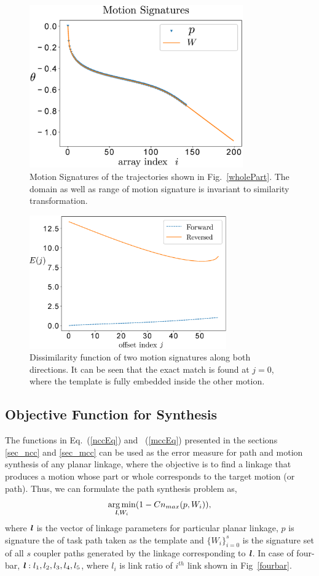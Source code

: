 \documentclass[twocolumn,10pt]{asme2ej}
\newcommand{\req}[1]{(\ref{#1})}
\DeclareMathOperator*{\argminA}{arg\,min}
\begin{document}
\begin{figure}
\centering
\includegraphics[width=260pt]{figure/fig_motion_signatures.eps}
  \caption{Motion Signatures of the trajectories shown in Fig.~\ref{wholePart}. The domain as well as range of motion signature is invariant to similarity transformation.}
\label{motionSignature}
\end{figure}

\begin{figure}
\centering
\includegraphics[width=240pt]{figure/fig_mcc.eps}
  \caption{Dissimilarity function of two motion signatures along both directions. It can be seen that the exact match is found at $j=0$, where the template is fully embedded inside the other motion.}
\label{mcc}
\end{figure}

\subsection{Objective Function for Synthesis}
The functions in Eq.~\req{nccEq} and ~\req{mccEq} presented in the sections \ref{sec_ncc} and \ref{sec_mcc} can be used as the error measure for path and motion synthesis of any planar linkage, where the objective is to find a linkage that produces a motion whose part or whole corresponds to the target motion (or path).
Thus, we can formulate the path synthesis problem as,
\begin{equation}\label{objectiveFunPath}
  \argminA_{\textbf{\emph{l}}, W_i} (1 - Cn_{max}(p, W_i)),
\end{equation}
where $\textbf{\emph{l}}$ is the vector of linkage parameters for particular planar linkage, $p$ is signature the of task path taken as the template and ${\{W_i\}}_{i=0}^{s}$ is the signature set of all $s$ coupler paths generated by the linkage corresponding to $\textbf{\emph{l}}$.
In case of four-bar, $\textbf{\emph{l}}: l_1, l_2, l_3, l_4, l_5$, where $l_i$ is link ratio of $i^{th}$ link shown in Fig~\ref{fourbar}.
\end{document}
